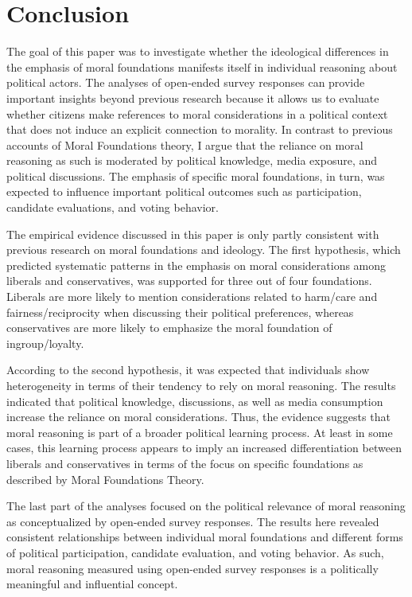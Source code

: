 \documentclass[12pt]{article}
\begin{document}
\section{Conclusion}

The goal of this paper was to investigate whether the ideological differences in the emphasis of moral foundations manifests itself in individual reasoning about political actors. The analyses of open-ended survey responses can provide important insights beyond previous research because it allows us to evaluate whether citizens make references to moral considerations in a political context that does not induce an explicit connection to morality. In contrast to previous accounts of Moral Foundations theory, I argue that the reliance on moral reasoning as such is moderated by political knowledge, media exposure, and political discussions. The emphasis of specific moral foundations, in turn, was expected to influence important political outcomes such as participation, candidate evaluations, and voting behavior.

The empirical evidence discussed in this paper is only partly consistent with previous research on moral foundations and ideology. The first hypothesis, which predicted systematic patterns in the emphasis on moral considerations among liberals and conservatives, was supported for three out of four foundations. Liberals are more likely to mention considerations related to harm/care and fairness/reciprocity when discussing their political preferences, whereas conservatives are more likely to emphasize the moral foundation of ingroup/loyalty.

According to the second hypothesis, it was expected that individuals show heterogeneity in terms of their tendency to rely on moral reasoning. The results indicated that political knowledge, discussions, as well as media consumption increase the reliance on moral considerations. Thus, the evidence suggests that moral reasoning is part of a broader political learning process. At least in some cases, this learning process appears to imply an increased differentiation between liberals and conservatives in terms of the focus on specific foundations as described by Moral Foundations Theory.

The last part of the analyses focused on the political relevance of moral reasoning as conceptualized by open-ended survey responses. The results here revealed consistent relationships between individual moral foundations and different forms of political participation, candidate evaluation, and voting behavior. As such, moral reasoning measured using open-ended survey responses is a politically meaningful and influential concept.
\end{document}
